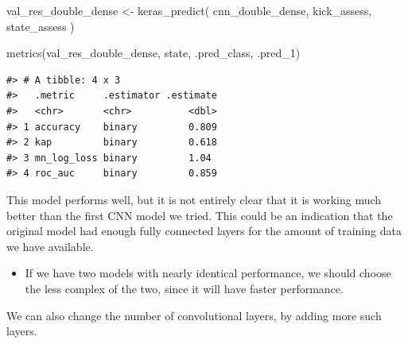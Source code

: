 \documentclass[
]{krantz}
\makeatletter
\newenvironment{Shaded}{\begin{snugshade}}{\end{snugshade}}
\newcommand{\FunctionTok}[1]{\textcolor[rgb]{0.00,0.00,0.00}{#1}}
\newcommand{\NormalTok}[1]{#1}
\newcommand{\OtherTok}[1]{\textcolor[rgb]{0.56,0.35,0.01}{#1}}
\newenvironment{kframe}{%
\medskip{}
\setlength{\fboxsep}{.8em}
 \def\at@end@of@kframe{}%
 \ifinner\ifhmode%
  \def\at@end@of@kframe{\end{minipage}}%
  \begin{minipage}{\columnwidth}%
 \fi\fi%
 \def\FrameCommand##1{\hskip\@totalleftmargin \hskip-\fboxsep
 \colorbox{shadecolor}{##1}\hskip-\fboxsep
     \hskip-\linewidth \hskip-\@totalleftmargin \hskip\columnwidth}%
 \MakeFramed {\advance\hsize-\width
   \@totalleftmargin\z@ \linewidth\hsize
   \@setminipage}}%
 {\par\unskip\endMakeFramed%
 \at@end@of@kframe}
\renewenvironment{Shaded}{\begin{kframe}}{\end{kframe}}
\newenvironment{rmdblock}[1]
  {\begin{shaded*}
  \begin{itemize}[left = -1cm, labelsep = 1cm]
  \renewcommand{\labelitemi}{
    \raisebox{-.7\height}[0pt][0pt]{
      {\setkeys{Gin}{width=3em,keepaspectratio}\texttt{[image: images/\#1]}}
    }
  }
 
  \item
  }
  {
  \end{itemize}
  \end{shaded*}
  }
\newenvironment{rmdwarning}
  {\begin{rmdblock}{warning}}
  {\end{rmdblock}}
\makeatother
\begin{document}
\begin{Shaded}
\begin{Highlighting}[]
\NormalTok{val\_res\_double\_dense }\OtherTok{\textless{}{-}} \FunctionTok{keras\_predict}\NormalTok{(}
\NormalTok{  cnn\_double\_dense,}
\NormalTok{  kick\_assess,}
\NormalTok{  state\_assess}
\NormalTok{)}

\FunctionTok{metrics}\NormalTok{(val\_res\_double\_dense, state, .pred\_class, .pred\_1)}
\end{Highlighting}
\end{Shaded}

\begin{verbatim}
#> # A tibble: 4 x 3
#>   .metric     .estimator .estimate
#>   <chr>       <chr>          <dbl>
#> 1 accuracy    binary         0.809
#> 2 kap         binary         0.618
#> 3 mn_log_loss binary         1.04 
#> 4 roc_auc     binary         0.859
\end{verbatim}

This model performs well, but it is not entirely clear that it is working much better than the first CNN model we tried. This could be an indication that the original model had enough fully connected layers for the amount of training data we have available.

\begin{rmdwarning}
If we have two models with nearly identical performance, we should
choose the less complex of the two, since it will have faster
performance.
\end{rmdwarning}

We can also change the number of convolutional layers, by adding more such layers.
\end{document}
